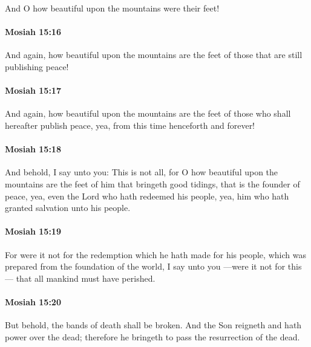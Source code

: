 			And O how beautiful upon the mountains were their feet!

		\paragraph{Mosiah 15:16} %
			\label{MOSIAH-15-16}

			And again, how beautiful upon the mountains are the feet of those
			that are still publishing peace!

		\paragraph{Mosiah 15:17} %
			\label{MOSIAH-15-17}

			And again, how beautiful upon the mountains are the feet of those
			who shall hereafter publish peace,
			yea, from this time henceforth and forever!

		\paragraph{Mosiah 15:18} %
			\label{MOSIAH-15-18}

			And behold, I say unto you:
			This is not all,
			for O how beautiful upon the mountains are the feet of him
			that bringeth good tidings,
			that is the founder of peace,
			yea, even the Lord who hath redeemed his people,
			yea, him who hath granted salvation unto his people.

		\paragraph{Mosiah 15:19} %
			\label{MOSIAH-15-19}

			For were it not for the redemption which he hath made for his people,
			which was prepared from the foundation of the world,
			I say unto you
			---were it not for this---
			that all mankind must have perished.

		\paragraph{Mosiah 15:20} %
			\label{MOSIAH-15-20}

			But behold, the bands of death shall be broken.
			And the Son reigneth and hath power over the dead;
			therefore he bringeth to pass the resurrection of the dead.

